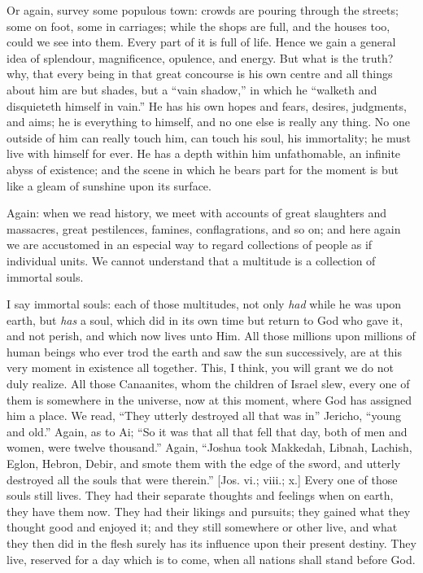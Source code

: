 Or again, survey some populous town: crowds are pouring through the
streets; some on foot, some in carriages; while the shops are full,
and the houses too, could we see into them. Every part of it is full
of life. Hence we gain a general idea of splendour, magnificence,
opulence, and energy. But what is the truth? why, that every being in
that great concourse is his own centre and all things about him are
but shades, but a ``vain shadow,'' in which he ``walketh
and disquieteth himself in vain.'' He has his own hopes and fears,
desires, judgments, and aims; he is everything to himself, and no one
else is really any thing. No one outside of him can really touch him,
can touch his soul, his immortality; he must live with himself for
ever. He has a depth within him unfathomable, an infinite abyss of
existence; and the scene in which he bears part for the moment is but
like a gleam of sunshine upon its surface.

Again: when we read history, we meet with accounts of great
slaughters and massacres, great pestilences, famines, conflagrations,
and so on; and here again we are accustomed in an especial way to
regard collections of people as if individual units. We cannot
understand that a multitude is a collection of immortal souls.

I say immortal souls: each of those multitudes, not only \emph{had}
while he was upon earth, but \emph{has} a soul, which did in its own
time but return to God who gave it, and not perish, and which now
lives unto Him. All those millions upon millions of human beings who
ever trod the earth and saw the sun successively, are at this very
moment in existence all together. This, I think, you will grant we do
not duly realize. All those Canaanites, whom the children of Israel
slew, every one of them is somewhere in the universe, now at this
moment, where God has assigned him a place. We read, ``They
utterly destroyed all that was in'' Jericho, ``young and
old.'' Again, as to Ai; ``So it was that all that fell that
day, both of men and women, were twelve thousand.'' Again,
``Joshua took Makkedah, Libnah, Lachish, Eglon, Hebron, Debir, and
smote them with the edge of the sword, and utterly destroyed all the
souls that were therein.'' [Jos. vi.; viii.; x.] Every one of
those souls still lives. They had their separate thoughts and feelings
when on earth, they have them now. They had their likings and
pursuits; they gained what they thought good and enjoyed it; and they
still somewhere or other live, and what they then did in the flesh
surely has its influence upon their present destiny. They live,
reserved for a day which is to come, when all nations shall stand
before God.

